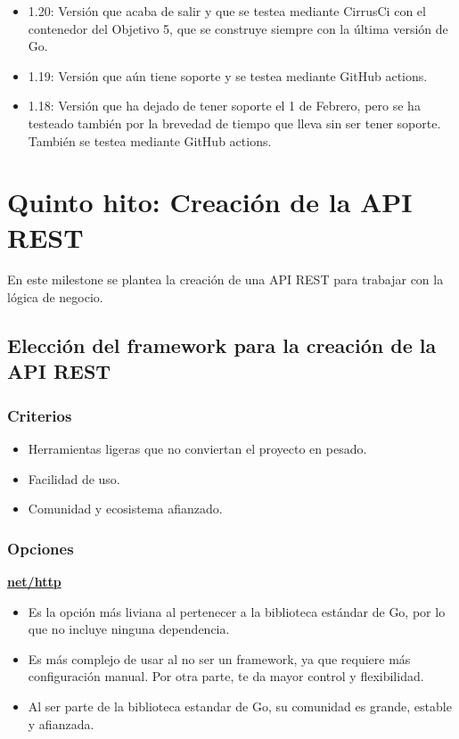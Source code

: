 \begin{itemize}
\item
  1.20: Versión que acaba de salir y que se testea mediante CirrusCi con
  el contenedor del Objetivo 5, que se construye siempre con la última
  versión de Go.
\item
  1.19: Versión que aún tiene soporte y se testea mediante GitHub
  actions.
\item
  1.18: Versión que ha dejado de tener soporte el 1 de Febrero, pero se
  ha testeado también por la brevedad de tiempo que lleva sin ser tener
  soporte. También se testea mediante GitHub actions.
\end{itemize}

\newpage
\section{Quinto hito: Creación de la API REST}

En este milestone se plantea la creación de una API REST para trabajar con la lógica de negocio.

\subsection{Elección del framework para la creación de la API REST}

\subsubsection{Criterios}

\begin{itemize}
\item
  Herramientas ligeras que no conviertan el proyecto en pesado.
\item
  Facilidad de uso.
\item
  Comunidad y ecosistema afianzado.
\end{itemize}

\subsubsection{Opciones}

\textbf{\href{https://pkg.go.dev/net/http}{net/http}}

\begin{itemize}
\item
  Es la opción más liviana al pertenecer a la biblioteca estándar de Go, por lo que no incluye ninguna dependencia.
\item
  Es más complejo de usar al no ser un framework, ya que requiere más configuración manual. Por otra parte, te da mayor control y flexibilidad.
\item
  Al ser parte de la biblioteca estandar de Go, su comunidad es grande, estable y afianzada.
\end{itemize}

